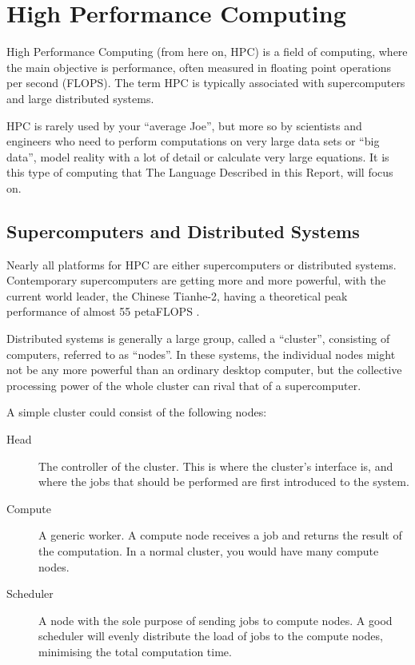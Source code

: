 \section{High Performance Computing}

High Performance Computing (from here on, HPC) is a field of computing, where the main objective is performance, often measured in floating point operations per second (FLOPS). The term HPC is typically associated with supercomputers and large distributed systems. 

HPC is rarely used by your \enquote{average Joe}, but more so by scientists and engineers who need to perform computations on very large data sets or \enquote{big data}, model reality with a lot of detail or calculate very large equations. It is this type of computing that The Language Described in this Report, will focus on.


\subsection{Supercomputers and Distributed Systems}

Nearly all platforms for HPC are either supercomputers or distributed systems. Contemporary supercomputers are getting more and more powerful, with the current world leader, the Chinese Tianhe-2, having a theoretical peak performance of almost 55 petaFLOPS \cite{top500}.

Distributed systems is generally a large group, called a \enquote{cluster}, consisting of computers, referred to as \enquote{nodes}. In these systems, the individual nodes might not be any more powerful than an ordinary desktop computer, but the collective processing power of the whole cluster can rival that of a supercomputer.

A simple cluster could consist of the following nodes:
\begin{description}
	\item [Head]
	The controller of the cluster. This is where the cluster's interface is, and where the jobs that should be performed are first introduced to the system.
	\item [Compute]
	A generic worker. A compute node receives a job and returns the result of the computation. In a normal cluster, you would have many compute nodes.
	\item [Scheduler]
	A node with the sole purpose of sending jobs to compute nodes. A good scheduler will evenly distribute the load of jobs to the compute nodes, minimising the total computation time.
\end{description}

